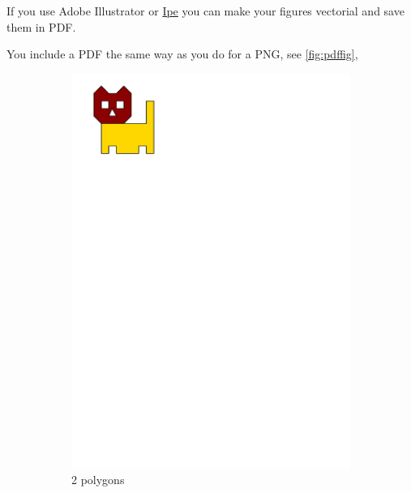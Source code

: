If you use Adobe Illustrator or \href{http://ipe7.sourceforge.net}{Ipe} you can make your figures vectorial and save them in PDF\@.

You include a PDF the same way as you do for a PNG, see \autoref{fig:pdffig},
\begin{figure}
  \centering
  \begin{subfigure}[b]{0.28\linewidth}
    \centering
    \includegraphics[page=1,width=\linewidth]{figs/tricat.pdf}
    \caption{2 polygons}\label{fig:pdffig:1}
  \end{subfigure}%
  \qquad %
  \begin{subfigure}[b]{0.28\linewidth}
    \centering

\end{subfigure}
\end{figure}
